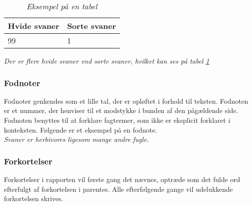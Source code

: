 \begin{table}[ht]
    \centering
    \begin{tabular}{ l | l }
        \textbf{Hvide svaner} & \textbf{Sorte svaner} \\
        \hline \hline
        99 & 1 \\
    \end{tabular}
    \caption{\textit{Eksempel på en tabel}}
    \label{tab:abc}
\end{table}

\noindent \textit{Der er flere hvide svaner end sorte svaner, hvilket kan ses på tabel \ref{tab:abc}}




\subsubsection*{Fodnoter}
Fodnoter genkendes som et lille tal, der er opløftet i forhold til teksten. Fodnoten er et nummer, der henviser til et modstykke i bunden af den pågældende side. Fodnoten benyttes til at forklare fagtermer, som ikke er eksplicit forklaret i konteksten. Følgende er et eksempel på en fodnote.\\

\noindent \textit{Svaner er herbivores ligesom mange andre fugle.}

\subsubsection*{Forkortelser}
Forkortelser i rapporten vil første gang det nævnes, optræde som det fulde ord efterfulgt af forkortelsen i parentes. Alle efterfølgende gange vil udelukkende forkortelsen skrives. \\


